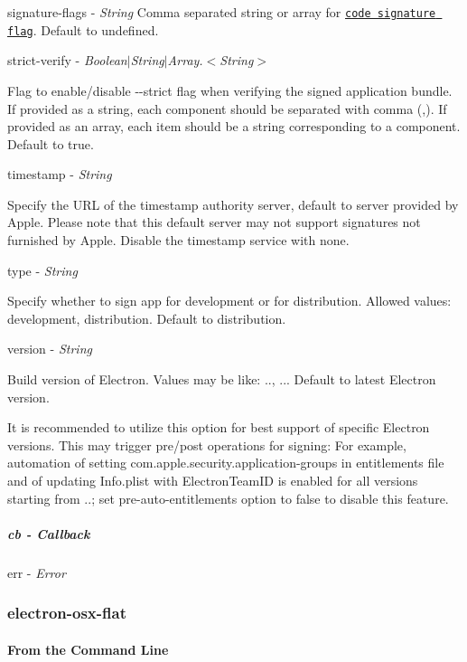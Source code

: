 {\ttfamily signature-\/flags} -\/ {\itshape String} Comma separated string or array for \href{https://developer.apple.com/documentation/security/seccodesignatureflags?language=objc}{\tt code signature flag}. Default to {\ttfamily undefined}.

{\ttfamily strict-\/verify} -\/ {\itshape Boolean$\vert$\+String$\vert$\+Array.$<$\+String$>$}

Flag to enable/disable {\ttfamily -\/-\/strict} flag when verifying the signed application bundle. If provided as a string, each component should be separated with comma ({\ttfamily ,}). If provided as an array, each item should be a string corresponding to a component. Default to {\ttfamily true}.

{\ttfamily timestamp} -\/ {\itshape String}

Specify the U\+RL of the timestamp authority server, default to server provided by Apple. Please note that this default server may not support signatures not furnished by Apple. Disable the timestamp service with {\ttfamily none}.

{\ttfamily type} -\/ {\itshape String}

Specify whether to sign app for development or for distribution. Allowed values\+: {\ttfamily development}, {\ttfamily distribution}. Default to {\ttfamily distribution}.

{\ttfamily version} -\/ {\itshape String}

Build version of Electron. Values may be like\+: {..}, {..}. Default to latest Electron version.

It is recommended to utilize this option for best support of specific Electron versions. This may trigger pre/post operations for signing\+: For example, automation of setting {\ttfamily com.\+apple.\+security.\+application-\/groups} in entitlements file and of updating {\ttfamily Info.\+plist} with {\ttfamily Electron\+Team\+ID} is enabled for all versions starting from {..}; set {\ttfamily pre-\/auto-\/entitlements} option to {\ttfamily false} to disable this feature.

\subparagraph*{cb -\/ Callback}

{\ttfamily err} -\/ {\itshape Error}

\subsubsection*{electron-\/osx-\/flat}

\paragraph*{From the Command Line}


